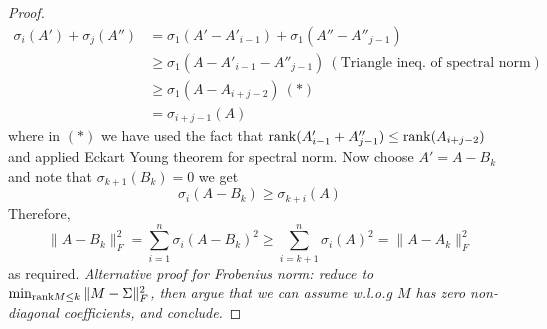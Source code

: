 \documentclass[../main.tex]{subfiles}
\begin{document}
\begin{proof}
	\begin{align*}
	\sigma_i(A')+\sigma_j(A'') &= \sigma_1(A'-A'_{i-1})+\sigma_1(A''-A''_{j-1})\\
	&\geq \sigma_1(A-A'_{i-1}-A''_{j-1})\ (\text{Triangle ineq. of spectral norm})\\
	&\geq \sigma_1(A-A_{i+j-2})\ (*)\\
	&=\sigma_{i+j-1}(A)
	\end{align*}
	where in $(*)$ we have used the fact that ${\rm rank}(A'_{i-1}+A''_{j-1})\leq {\rm rank}(A_{i+j-2})$ and applied Eckart Young theorem for spectral norm. Now choose $A'=A-B_k$ and note that $\sigma_{k+1}(B_k)=0$ we get
	\begin{equation*}
	\sigma_i(A-B_k)\geq \sigma_{k+i}(A)
	\end{equation*}
	Therefore,
	\begin{equation*}
	\|A-B_k\|_F^2 = \sum_{i=1}^{n}\sigma_i(A-B_k)^2\geq \sum_{i=k+1}^{n}\sigma_i(A)^2 = \|A-A_k\|_F^2
	\end{equation*}
	as required. 
	\textit{
		Alternative proof for Frobenius norm: reduce to $\min_{{\rm rank} M \leq k} \|M-\Sigma\|_F^2$, then argue that we can assume w.l.o.g $M$ has zero non-diagonal coefficients, and conclude.	}
\end{proof}
\end{document}
